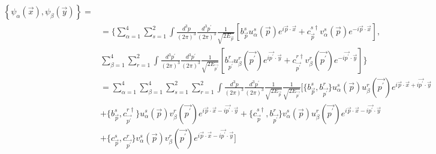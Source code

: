 \documentclass[12pt, letterpaper]{article}
\newcommand*{\1}{\hspace{1pt}}
\begin{document}
\begin{align*}
    \left\{ \psi _{\alpha} (\overrightarrow{x}) , \psi _{\beta }(\overrightarrow{y})  \right\} =&\\
    &= \bigg\{\sum_{\alpha = 1}^{4}\sum_{s = 1}^{2} \int \frac{d ^{3} p}{(2 \pi) ^{3}} \frac{d ^{3} p ^{\prime}}{(2 \pi) ^{3}}\frac{1}{\sqrt{2 E _{\overrightarrow{p}}}} \left[b^{s} _{\overrightarrow{p}}u^{s} _{\alpha}(\overrightarrow{p}) e ^{i \overrightarrow{p} \cdot \overrightarrow{x}} + c^{s \dagger} _{\overrightarrow{p}}v^{s} _{\alpha}(\overrightarrow{p}) e ^{ - i \overrightarrow{p} \cdot \overrightarrow{x}}\right], \\
    & \sum_{\beta = 1}^{4} \sum_{r = 1}^{2} \int \frac{d ^{3} p^{\prime}}{(2 \pi) ^{3}}\frac{d ^{3} p ^{\prime}}{(2 \pi) ^{3}} \frac{1}{\sqrt{2 E _{\overrightarrow{p^{\prime}}}}} \left[b^{r} _{\overrightarrow {p ^{\prime}}}u^{r} _{\beta}(\overrightarrow{p ^{\prime}}) e ^{i \overrightarrow{p^{\prime}} \cdot \overrightarrow{y}} + c^{r \dagger} _{\overrightarrow{p ^{\prime}}}v^{r} _{\beta}(\overrightarrow{p ^{\prime}}) e ^{-i \overrightarrow{p ^{\prime}} \cdot \overrightarrow{y}}\right] \bigg\} \\
    & = \sum_{\alpha = 1}^{4}\sum_{\beta = 1}^{4} \sum_{s = 1}^{2} \sum_{r = 1}^{2} \int \frac{d ^{3} p}{(2 \pi) ^{3}} \frac{d ^{3} p ^{\prime}}{(2 \pi) ^{3}} \frac{1}{\sqrt{2 E _{\overrightarrow{p}}}} \frac{1}{\sqrt{2 E _{\overrightarrow{p^{\prime}}}}}\bigg[ \big\{b^{s} _{\overrightarrow{p}}, b^{r} _{\overrightarrow {p ^{\prime}}}\big\} u^{s} _{\alpha}(\overrightarrow{p})u^{r} _{\beta}(\overrightarrow{p ^{\prime}})e ^{i \overrightarrow{p} \cdot \overrightarrow{x} +i \overrightarrow{p^{\prime}} \cdot \overrightarrow{y}} \\ 
    &+ \big\{b^{s} _{\overrightarrow{p}}, c^{r \dagger} _{\overrightarrow {p ^{\prime}}}\big\}u^{s} _{\alpha}(\overrightarrow{p})v^{r} _{\beta}(\overrightarrow{p ^{\prime}})e ^{i \overrightarrow{p} \cdot \overrightarrow{x} - i \overrightarrow{p^{\prime}} \cdot \overrightarrow{y}} + \big\{c^{s \dagger} _{\overrightarrow{p}}, b^{r} _{\overrightarrow {p ^{\prime}}}\big\}v^{s} _{\alpha}(\overrightarrow{p})u^{r} _{\beta}(\overrightarrow{p ^{\prime}})e ^{i \overrightarrow{p} \cdot \overrightarrow{x} - i \overrightarrow{p^{\prime}} \cdot \overrightarrow{y}}  \\
    &+ \big\{c^{s} _{\overrightarrow{p}}, c^{r} _{\overrightarrow {p ^{\prime}}}\big\}v^{s} _{\alpha}(\overrightarrow{p})v^{r} _{\beta}(\overrightarrow{p ^{\prime}})e ^{i \overrightarrow{p} \cdot \overrightarrow{x} - i \overrightarrow{p^{\prime}} \cdot \overrightarrow{y}} \bigg]
\end{align*}
\end{document}

